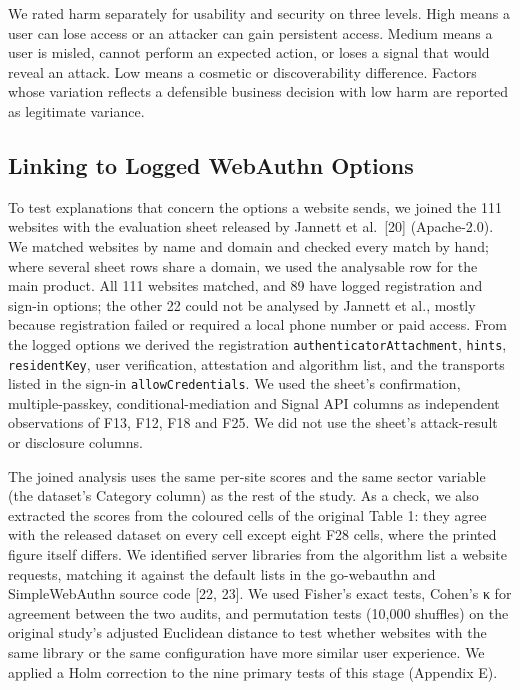 \documentclass[letterpaper,twocolumn,10pt]{article}
\begin{document}
We rated harm separately for usability and security on three levels. High means a user can lose access or an attacker can gain persistent access. Medium means a user is misled, cannot perform an expected action, or loses a signal that would reveal an attack. Low means a cosmetic or discoverability difference. Factors whose variation reflects a defensible business decision with low harm are reported as legitimate variance.

\subsection{Linking to Logged WebAuthn Options}

To test explanations that concern the options a website sends, we joined the 111 websites with the evaluation sheet released by Jannett et al.~{[}20{]} (Apache-2.0). We matched websites by name and domain and checked every match by hand; where several sheet rows share a domain, we used the analysable row for the main product. All 111 websites matched, and 89 have logged registration and sign-in options; the other 22 could not be analysed by Jannett et al., mostly because registration failed or required a local phone number or paid access. From the logged options we derived the registration \texttt{authenticatorAttachment}, \texttt{hints}, \texttt{residentKey}, user verification, attestation and algorithm list, and the transports listed in the sign-in \texttt{allowCredentials}. We used the sheet's confirmation, multiple-passkey, conditional-mediation and Signal API columns as independent observations of F13, F12, F18 and F25. We did not use the sheet's attack-result or disclosure columns.

The joined analysis uses the same per-site scores and the same sector variable (the dataset's Category column) as the rest of the study. As a check, we also extracted the scores from the coloured cells of the original Table 1: they agree with the released dataset on every cell except eight F28 cells, where the printed figure itself differs. We identified server libraries from the algorithm list a website requests, matching it against the default lists in the go-webauthn and SimpleWebAuthn source code {[}22, 23{]}. We used Fisher's exact tests, Cohen's κ for agreement between the two audits, and permutation tests (10,000 shuffles) on the original study's adjusted Euclidean distance to test whether websites with the same library or the same configuration have more similar user experience. We applied a Holm correction to the nine primary tests of this stage (Appendix E).
\end{document}
